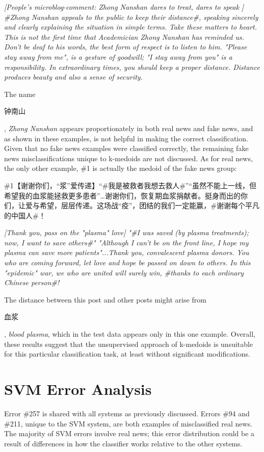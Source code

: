 \documentclass [11pt, proquest] {uwthesis}[2020/02/24]
\begin{document}
\textit{[People's microblog-comment: Zhong Nanshan dares to treat, dares to speak ] \#Zhong Nanshan appeals to the public to keep their distance\#, speaking sincerely and clearly explaining the situation in simple terms. Take these matters to heart. This is not the first time that Academician Zhong Nanshan has reminded us. Don't be deaf to his words, the best form of respect is to listen to him. "Please stay away from me",
is a gesture of goodwill; "I stay away from you" is a responsibility. In extraordinary times, you should keep a proper distance. Distance produces beauty and also a sense of security.}

The name \begin{CJK*}{UTF8}{gbsn}钟南山\end{CJK*}, \textit{Zhong Nanshan} appears proportionately in both real news and fake news, and as shown in these examples, is not helpful in making the correct classification. Given that no fake news examples were classified correctly, the remaining fake news misclassifications unique to k-medoids are not discussed. As for real news, the only other example, \#1 is actually the medoid of the fake news group:

\begin{CJK*}{UTF8}{gbsn} \#1【谢谢你们，“浆”爱传递】“\#我是被救者我想去救人\#”“虽然不能上一线，但希望我的血浆能拯救更多患者”…谢谢你们，恢复期血浆捐献者。挺身而出的你们，让爱与希望，层层传递。这场战“疫”，团结的我们一定能赢，\#谢谢每个平凡的中国人\#​​​！\end{CJK*}

\textit{[Thank you, pass on the "plasma" love] "\#I was saved (by plasma treatments); now, I want to save others\#" "Although I can't be on the front line, I hope my plasma can save more patients"...Thank you, convalescent plasma donors. You who are coming forward, let love and hope be passed on down to others. In this "epidemic" war, we who are united will surely win, \#thanks to each ordinary Chinese person\#!}

The distance between this post and other posts might arise from \begin{CJK*}{UTF8}{gbsn}血浆\end{CJK*}, \textit{blood plasma}, which in the test data appears only in this one example.
Overall, these results suggest that the unsupervised approach of k-medoids is unsuitable for this particular classification task, at least without significant modifications.
\section{SVM Error Analysis}
Error \#257 is shared with all systems as previously discussed. Errors \#94 and \#211, unique to the SVM system, are both examples of misclassified real news. The majority of SVM errors involve real news; this error distribution could be a result of differences in how the classifier works relative to the other systems.
\end{document}
